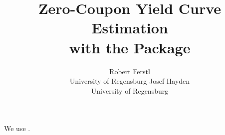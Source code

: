 \documentclass[article]{jss}
\author{Robert Ferstl\\University of Regensburg \And 
        Josef Hayden\\ University of Regensburg}
\title{Zero-Coupon Yield Curve Estimation\\ with the Package \pkg{termstrc}}
\begin{document}









We use \cite{R2007}.



\end{document}
